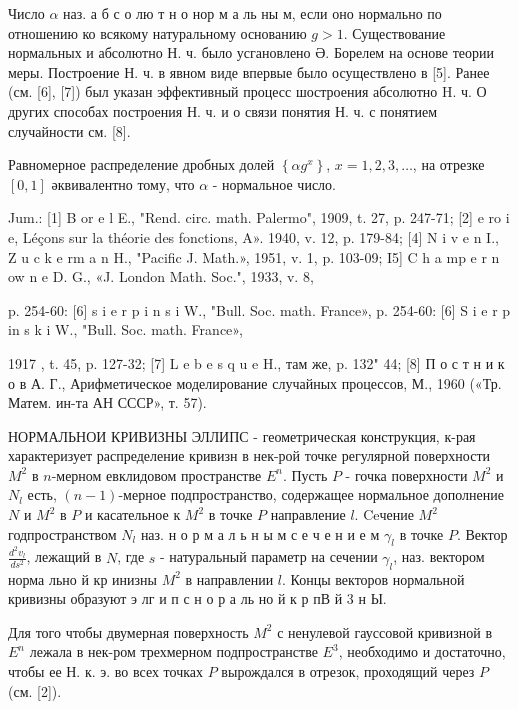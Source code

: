\documentclass[10pt]{article}
\begin{document}
Число $\alpha$ наз. а б с о лю т н о нор м а ль ны м, если оно нормально по отношению ко всякому натуральному основанию $g>1$. Существование нормальных и абсолютно Н. ч. было усгановлено Ә. Борелем на основе теории меры. Построение Н. ч. в явном виде впервые было осуществлено в [5]. Ранее (см. [6], [7]) был указан эффективный процесс шостроения абсолютно H. ч. О других способах построения Н. ч. и о связи понятия Н. ч. с понятием случайности см. [8].



Равномерное распределение дробных долей $\left\{\alpha g^{x}\right\}$, $x=1,2,3, \ldots$, на отрезке $[0,1]$ әквивалентно тому, что $\alpha$ - нормальное число.



Jum.: [1] B or e l E., "Rend. circ. math. Palermo", 1909, t. 27, p. 247-71; [2] e ro i e, Léçons sur la théorie des fonctions, A». 1940, v. 12, p. 179-84; [4] N i v e n I., Z u c k e rm a n H., "Pacific J. Math.», 1951, v. 1, p. 103-09; I5] C h a mp e r n ow n e D. G., «J. London Math. Soc.", 1933, v. 8,

p. 254-60: [6] s i e r p i n s i W., "Bull. Soc. math. France», p. 254-60: [6] S i e r p in s k i W., "Bull. Soc. math. France»,

1917 , t. 45, p. 127-32; [7] L e b e s q u e H., там же, p. 132" 44; [8] П о с т н и к о в А. Г., Арифметическое моделирование случайных процессов, М., 1960 («Тр. Матем. ин-та АН СССР», т. 57).



НОРМАЛЬНОИ КРИВИЗНЫ ЭЛЛИПС - геометрическая конструкция, к-рая характеризует распределение кривизн в нек-рой точке регулярной поверхности $M^{2}$ в $n$-мерном евклидовом пространстве $E^{n}$. Пусть $P$ - гочка поверхности $M^{2}$ и $N_{l}$ есть, $(n-1)$-мерное подпространство, содержащее нормальное дополнение $N$ и $M^{2}$ в $P$ и касательное к $M^{2}$ в точке $P$ направление $l$. Ceчение $M^{2}$ годпространством $N_{l}$ наз. н о р м а л ь н ы м с е ч е н и е м $\gamma_{l}$ в точке $P$. Вектор $\frac{d^{2} v_{l}}{d s^{2}}$, лежащий в $N$, где $s$ - натуральный параметр на сечении $\gamma_{l}$, наз. вектором норма льно й кр инизны $M^{2}$ в направлении $l$. Концы векторов нормальной кривизны образуют э лг и п с н о р а ль но й к р пВ й 3 н Ы.



Для того чтобы двумерная поверхность $M^{2}$ с ненулевой гауссовой кривизной в $E^{n}$ лежала в нек-ром трехмерном подпространстве $E^{3}$, необходимо и достаточно, чтобы ее Н. к. э. во всех точках $P$ вырождался в отрезок, проходящий через $P$ (см. [2]).
\end{document}
